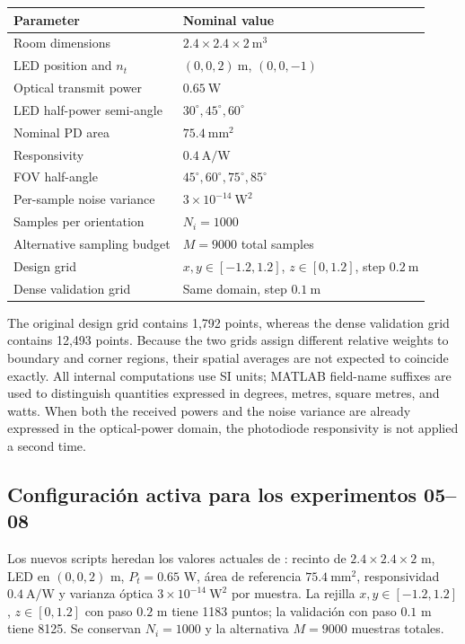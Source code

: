 \documentclass[11pt,a4paper]{article}
\begin{document}
\begin{center}
\begin{tabular}{ll}
\toprule
Parameter & Nominal value \\
\midrule
Room dimensions & $2.4\times2.4\times2\ \mathrm{m}^3$ \\
LED position and $n_t$ & $(0,0,2)\ \mathrm{m}$, $(0,0,-1)$ \\
Optical transmit power & $0.65\ \mathrm{W}$ \\
LED half-power semi-angle & $30^\circ,45^\circ,60^\circ$ \\
Nominal PD area & $75.4\ \mathrm{mm}^2$ \\
Responsivity & $0.4\ \mathrm{A/W}$ \\
FOV half-angle & $45^\circ,60^\circ,75^\circ,85^\circ$ \\
Per-sample noise variance & $3\times10^{-14}\ \mathrm{W}^2$ \\
Samples per orientation & $N_i=1000$ \\
Alternative sampling budget & $M=9000$ total samples \\
Design grid & $x,y\in[-1.2,1.2]$, $z\in[0,1.2]$, step $0.2\ \mathrm{m}$ \\
Dense validation grid & Same domain, step $0.1\ \mathrm{m}$ \\
\bottomrule
\end{tabular}
\end{center}

The original design grid contains 1,792 points, whereas the dense validation grid contains 12,493 points. Because the two grids assign different relative weights to boundary and corner regions, their spatial averages are not expected to coincide exactly. All internal computations use SI units; MATLAB field-name suffixes are used to distinguish quantities expressed in degrees, metres, square metres, and watts. When both the received powers and the noise variance are already expressed in the optical-power domain, the photodiode responsivity is not applied a second time.

\subsection{Configuración activa para los experimentos 05--08}
Los nuevos scripts heredan los valores actuales de : recinto de $2.4\times2.4\times2$ m, LED en $(0,0,2)$ m, $P_t=0.65$ W, área de referencia $75.4\ \mathrm{mm}^2$, responsividad $0.4\ \mathrm{A/W}$ y varianza óptica $3\times10^{-14}\ \mathrm W^2$ por muestra. La rejilla $x,y\in[-1.2,1.2]$, $z\in[0,1.2]$ con paso $0.2$ m tiene 1183 puntos; la validación con paso $0.1$ m tiene 8125. Se conservan $N_i=1000$ y la alternativa $M=9000$ muestras totales.
\end{document}
